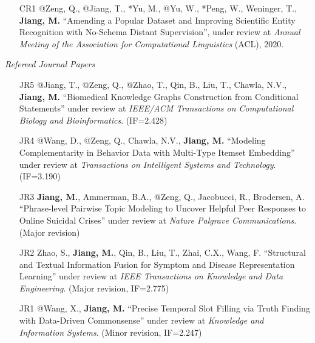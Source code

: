 \documentclass[10pt]{article}
\newenvironment{myindentpar}[1]%
{\begin{list}{}%
         {\setlength{\leftmargin}{#1}}%
         \item[]%
}
{\end{list}}
\newcounter{list}
\begin{document}
\begin{myindentpar}{0.00cm}
\begin{enumerate}[leftmargin=.5cm]
\item[CR1] @Zeng, Q., @Jiang, T., *Yu, M., @Yu, W., *Peng, W., Weninger, T., \textbf{Jiang, M.} ``Amending a Popular Dataset and Improving Scientific Entity Recognition with No-Schema Distant Supervision'', under review at \textit{Annual Meeting of the Association for Computational Linguistics} (ACL), 2020.

\end{enumerate}

\hspace{-0.25cm}\emph{Refereed Journal Papers}

\begin{enumerate}[leftmargin=.5cm]

\item[JR5] @Jiang, T., @Zeng, Q., @Zhao, T., Qin, B., Liu, T., Chawla, N.V., \textbf{Jiang, M.} ``Biomedical Knowledge Graphs Construction from Conditional Statements'' under review at \textit{IEEE/ACM Transactions on Computational Biology and Bioinformatics}. (IF=2.428)
		
\item[JR4] @Wang, D., @Zeng, Q., Chawla, N.V., \textbf{Jiang, M.} ``Modeling Complementarity in Behavior Data with Multi-Type Itemset Embedding'' under review at \textit{Transactions on Intelligent Systems and Technology}. (IF=3.190)
	
\item[JR3] \textbf{Jiang, M.}, Ammerman, B.A., @Zeng, Q., Jacobucci, R., Brodersen, A. ``Phrase-level Pairwise Topic Modeling to Uncover Helpful Peer Responses to Online Suicidal Crises'' under review at \textit{Nature Palgrave Communications}. (Major revision)	

\item[JR2] Zhao, S., \textbf{Jiang, M.}, Qin, B., Liu, T., Zhai, C.X., Wang, F. ``Structural and Textual Information Fusion for Symptom and Disease Representation Learning'' under review at \textit{IEEE Transactions on Knowledge and Data Engineering}. (Major revision, IF=2.775)	
	
\item[JR1] @Wang, X., \textbf{Jiang, M.} ``Precise Temporal Slot Filling via Truth Finding with Data-Driven Commonsense'' under review at \textit{Knowledge and Information Systems}. (Minor revision, IF=2.247)
	
\end{enumerate}


	

\end{myindentpar}
\end{document}
